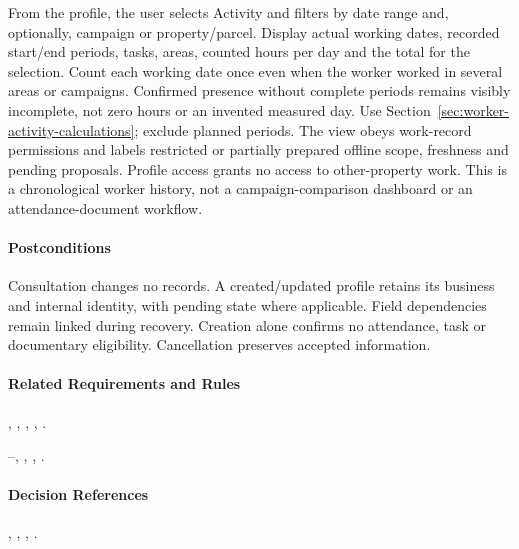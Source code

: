 \begin{description}[style=nextline]
\item[A9 --- Days and hours worked.] From the profile, the user selects Activity
and filters by date range and, optionally, campaign or property/parcel. Display
actual working dates, recorded start/end periods, tasks, areas, counted hours per
day and the total for the selection. Count each working date once even when the
worker worked in several areas or campaigns. Confirmed presence without complete
periods remains visibly incomplete, not zero hours or an invented measured day.
Use Section~\ref{sec:worker-activity-calculations}; exclude planned periods.
The view obeys work-record permissions and labels restricted or partially prepared
offline scope, freshness and pending proposals. Profile access grants no access to
other-property work. This is a chronological worker history, not a campaign-comparison
dashboard or an attendance-document workflow.
\end{description}
\paragraph{Postconditions}
Consultation changes no records. A created/updated profile retains its business and
internal identity, with pending state where applicable. Field dependencies remain
linked during recovery. Creation alone confirms no attendance, task or documentary
eligibility. Cancellation preserves accepted information.
\paragraph{Related Requirements and Rules}
\hyperref[fr:004]{}, \hyperref[fr:020]{}, \hyperref[fr:021]{}, \hyperref[fr:022]{}, \hyperref[fr:023]{}.

\hyperref[br:013]{}--\hyperref[br:016]{}, \hyperref[br:019]{}, \hyperref[br:020]{}, \hyperref[br:037]{}.
\paragraph{Decision References}
, , , .

